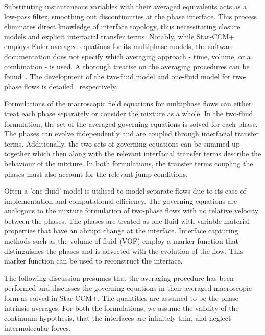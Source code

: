 Substituting instantaneous variables with their averaged 
 equivalents acts as a low-pass filter, smoothing out discontinuities 
 at the phase interface. This process eliminates direct knowledge of 
 interface topology, thus necessitating closure models and 
 explicit interfacial transfer terms. Notably, while Star-CCM+ 
 employs Euler-averaged equations for its multiphase models, 
 the software documentation does not specify which averaging 
 approach - time, volume, or a combination - is used.
A thorough treatise on the averaging procedures can be found~. The development
of the two-fluid model and one-fluid model for two-phase flows is detailed~ respectively. 
 ~~\cite{ishiiThermoFluidDynamicsTwoPhase2011,wornerCompactIntroductionNumerical, prosperettiCOMPUTATIONALMETHODSMULTIPHASE, brennenFundamentalsMultiphaseFlow2006}~


Formulations of the macroscopic field equations for multiphase flows can either treat each phase
 separately or consider the mixture as a whole. In the two-fluid formulation, the set of the averaged governing 
 equations is solved for each phase. The phases can evolve independently and are
 coupled through interfacial transfer terms.
 Additionally, the two sets of governing equations
 can be summed up together which then along with the relevant interfacial transfer 
 terms describe the behaviour
 of the mixture. 
 In both formulations, the transfer terms coupling the phases must also 
 account for the relevant jump conditions.~\cite{ishiiThermoFluidDynamicsTwoPhase2011,wornerCompactIntroductionNumerical,tryggvasonDirectNumericalSimulations2011, yadigarogluNatureMultiphaseFlows2018}

Often a 'one-fluid' model is utilised to model separate flows due to its ease of implementation
 and computational efficiency. The governing equations are analogous to the 
 mixture formulation of two-phase flows with no relative velocity between the phases.
 The phases are treated as one fluid with variable 
 material properties that have an abrupt change at the interface. Interface capturing 
 methods such as the volume-of-fluid (VOF) employ a marker function that distinguishes
 the phases and is advected with the evolution of the flow. This marker function can be used
 to reconstruct the interface.~\cite{gadaLargeScaleInterface2017,tryggvasonDirectNumericalSimulations2011,prosperettiCOMPUTATIONALMETHODSMULTIPHASE}~

The following discussion presumes that the averaging procedure has been performed and discusses the governing equations
in their averaged macroscopic form as solved in Star-CCM+. The quantities are assumed to be 
the phase intrinsic averages. For both the formulations, we assume the validity of the continuum 
hypothesis, that the interfaces are infinitely thin, and neglect intermolecular forces.


